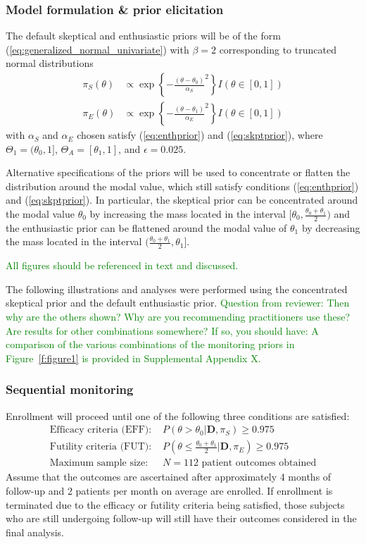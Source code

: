 \documentclass[12pt]{article}
\begin{document}
\subsubsection{Model formulation \& prior elicitation}
The default skeptical and enthusiastic priors will be of the form (\ref{eq:generalized_normal_univariate}) with $\beta=2$ corresponding to truncated normal distributions
\begin{align*}
\pi_S(\theta)&\propto \exp\left\{-\frac{(\theta-\theta_0)}{\alpha_S}^2\right\} I(\theta\in[0,1])\\
\pi_E(\theta)&\propto \exp\left\{-\frac{(\theta-\theta_1)}{\alpha_E}^2\right\} I(\theta\in[0,1])
\end{align*}
with $\alpha_S$ and $\alpha_E$ chosen satisfy (\ref{eq:enthprior}) and (\ref{eq:skptprior}), where $\Theta_1=(\theta_0,1]$, $\Theta_A=[\theta_1,1]$, and $\epsilon=0.025$.

Alternative specifications of the priors will be used to concentrate or flatten the distribution around the modal value, which still satisfy conditions (\ref{eq:enthprior}) and (\ref{eq:skptprior}). In particular, the skeptical prior can be concentrated around the modal value $\theta_0$ by increasing the mass located in the interval $[\theta_0,\frac{\theta_0+\theta_1}{2})$ and the enthusiastic prior can be flattened around the modal value of $\theta_1$ by decreasing the mass located in the interval $(\frac{\theta_0+\theta_1}{2},\theta_1]$.

\textcolor{green}{All figures should be referenced in text and discussed.}


 

The following illustrations and analyses were performed using the concentrated skeptical prior and the default enthusiastic prior.
\textcolor{green}{Question from reviewer: Then why are the others shown? Why are you recommending practitioners use these? Are results for other combinations somewhere?
%
If so, you should have: A comparison of the various combinations of the monitoring priors in Figure~\ref{f:figure1} is provided in Supplemental Appendix X.}
\subsubsection{Sequential monitoring}
Enrollment will proceed until one of the following three conditions are satisfied:
\begin{align*}
\text{Efficacy criteria (EFF): }&P(\theta>\theta_0|\mathbf{D},\pi_S)\geq 0.975\\
\text{Futility criteria (FUT): }&P\left(\theta\leq\frac{\theta_0+\theta_1}{2} \Big|\mathbf{D},\pi_E\right)\geq 0.975\\
\text{Maximum sample size: }&N=112 \text{ patient outcomes obtained}
\end{align*}
Assume that the outcomes are ascertained after approximately 4 months of follow-up and 2 patients per month on average are enrolled. If enrollment is terminated due to the efficacy or futility criteria being satisfied, those subjects who are still undergoing follow-up will still have their outcomes considered in the final analysis.
\end{document}
